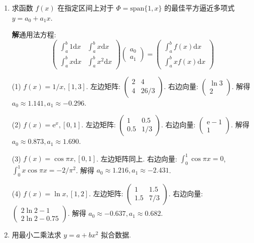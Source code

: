 \documentclass[a4paper,11pt]{ctexart}
\newcommand{\sol}{\par\noindent\textbf{解}\quad}
\newcommand{\ud}{\mathrm{d}}
\newcommand{\e}{\mathrm{e}}
\begin{document}
\begin{enumerate}[label=\textbf{3-\arabic*.}, leftmargin=*]
    \item[14.] 求函数 $f(x)$ 在指定区间上对于 $\Phi = \text{span}\{1, x\}$ 的最佳平方逼近多项式 $y=a_0+a_1x$.
    
    \sol 通用法方程:
    \[
    \begin{pmatrix} \int_a^b 1 \ud x & \int_a^b x \ud x \\ \int_a^b x \ud x & \int_a^b x^2 \ud x \end{pmatrix} \begin{pmatrix} a_0 \\ a_1 \end{pmatrix} = \begin{pmatrix} \int_a^b f(x) \ud x \\ \int_a^b x f(x) \ud x \end{pmatrix}
    \]
    
    (1) $f(x)=1/x, [1, 3]$.
    左边矩阵: $\begin{pmatrix} 2 & 4 \\ 4 & 26/3 \end{pmatrix}$. 右边向量: $\begin{pmatrix} \ln 3 \\ 2 \end{pmatrix}$.
    解得 $a_0 \approx 1.141, a_1 \approx -0.296$.
    
    (2) $f(x)=\e^x, [0, 1]$.
    左边矩阵: $\begin{pmatrix} 1 & 0.5 \\ 0.5 & 1/3 \end{pmatrix}$. 右边向量: $\begin{pmatrix} \e-1 \\ 1 \end{pmatrix}$.
    解得 $a_0 \approx 0.873, a_1 \approx 1.690$.
    
    (3) $f(x)=\cos \pi x, [0, 1]$.
    左边矩阵同上. 右边向量: $\int_0^1 \cos \pi x = 0$, $\int_0^1 x \cos \pi x = -2/\pi^2$.
    解得 $a_0 \approx 1.216, a_1 \approx -2.431$.
    
    (4) $f(x)=\ln x, [1, 2]$.
    左边矩阵: $\begin{pmatrix} 1 & 1.5 \\ 1.5 & 7/3 \end{pmatrix}$. 右边向量: $\begin{pmatrix} 2\ln 2 - 1 \\ 2\ln 2 - 0.75 \end{pmatrix}$.
    解得 $a_0 \approx -0.637, a_1 \approx 0.682$.

    \item[17.] 用最小二乘法求 $y = a + bx^2$ 拟合数据.
    

\end{enumerate}
\end{document}
